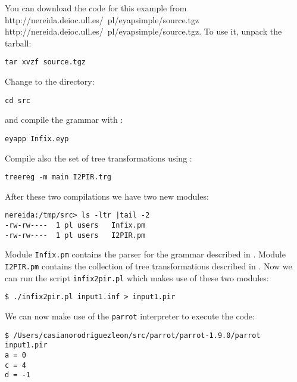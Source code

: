 You can download the code for this example from
\htmladdnormallink
{http://nereida.deioc.ull.es/~pl/eyapsimple/source.tgz}
{http://nereida.deioc.ull.es/~pl/eyapsimple/source.tgz}.
To use it, unpack the tarball:
\begin{verbatim}
tar xvzf source.tgz
\end{verbatim}
Change to the directory:
\begin{verbatim}
cd src
\end{verbatim}
and compile the grammar with :
\begin{verbatim}
eyapp Infix.eyp
\end{verbatim}
Compile also the set of tree transformations using :
\begin{verbatim}
treereg -m main I2PIR.trg
\end{verbatim}
After these two compilations we have two new modules:
\begin{verbatim}
nereida:/tmp/src> ls -ltr |tail -2
-rw-rw----  1 pl users   Infix.pm
-rw-rw----  1 pl users   I2PIR.pm
\end{verbatim}
Module \verb|Infix.pm| contains the parser for the grammar described in .
Module \verb|I2PIR.pm| contains the collection of tree transformations described
in . Now we can run the script \verb|infix2pir.pl| which makes use of these
two modules:
\begin{verbatim}
$ ./infix2pir.pl input1.inf > input1.pir
\end{verbatim}
We can now make use of the \verb|parrot| interpreter to execute the code:
\begin{verbatim}
$ /Users/casianorodriguezleon/src/parrot/parrot-1.9.0/parrot input1.pir 
a = 0
c = 4
d = -1
\end{verbatim}

